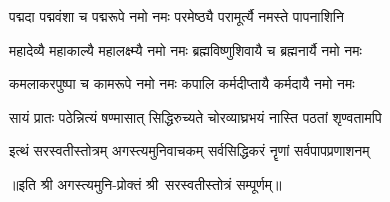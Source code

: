 \twolineshloka
{पद्मदा पद्मवंशा च पद्मरूपे नमो नमः}
{परमेष्ठ्यै परामूर्त्यै नमस्ते पापनाशिनि}

\twolineshloka
{महादेव्यै महाकाल्यै महालक्ष्म्यै नमो नमः}
{ब्रह्मविष्णुशिवायै च ब्रह्मनार्यै नमो नमः}

\twolineshloka
{कमलाकरपुष्पा च कामरूपे नमो नमः}
{कपालि कर्मदीप्तायै कर्मदायै नमो नमः}

\twolineshloka
{सायं प्रातः पठेन्नित्यं षण्मासात् सिद्धिरुच्यते}
{चोरव्याघ्रभयं नास्ति पठतां शृण्वतामपि}

\twolineshloka
{इत्थं सरस्वतीस्तोत्रम् अगस्त्यमुनिवाचकम्}
{सर्वसिद्धिकरं नॄणां सर्वपापप्रणाशनम्}

॥इति श्री अगस्त्यमुनि-प्रोक्तं श्री~सरस्वतीस्तोत्रं सम्पूर्णम्॥